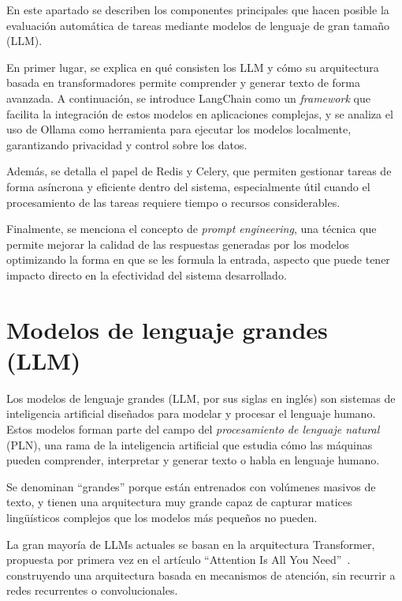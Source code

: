 
En este apartado se describen los componentes principales que hacen posible la evaluación 
automática de tareas mediante modelos de lenguaje de gran tamaño (LLM). 

En primer lugar, se explica en qué consisten los LLM y cómo su arquitectura basada en 
transformadores permite comprender y generar texto de forma avanzada. A continuación, 
se introduce LangChain como un \textit{framework} que facilita la integración de estos 
modelos en aplicaciones complejas, y se analiza el uso de Ollama como herramienta para 
ejecutar los modelos localmente, garantizando privacidad y control sobre los datos.

Además, se detalla el papel de Redis y Celery, que permiten gestionar tareas de forma 
asíncrona y eficiente dentro del sistema, especialmente útil cuando el procesamiento de 
las tareas requiere tiempo o recursos considerables.

Finalmente, se menciona el concepto de \textit{prompt engineering}, una técnica que permite 
mejorar la calidad de las respuestas generadas por los modelos optimizando la forma en que 
se les formula la entrada, aspecto que puede tener impacto directo en la efectividad del 
sistema desarrollado.

\section{Modelos de lenguaje grandes (LLM)}

Los modelos de lenguaje grandes (LLM, por sus siglas en inglés) son sistemas de 
inteligencia artificial diseñados para modelar y procesar el lenguaje humano. 
Estos modelos forman parte del campo del \textit{procesamiento de lenguaje natural} (PLN), 
una rama de la inteligencia artificial que estudia cómo las máquinas pueden comprender, 
interpretar y generar texto o habla en lenguaje humano.

Se denominan ``grandes'' porque están entrenados con volúmenes 
masivos de texto, y tienen una arquitectura muy grande capaz de capturar matices 
lingüísticos complejos que los modelos más pequeños no pueden.

La gran mayoría de LLMs actuales se basan en la arquitectura Transformer, propuesta por 
primera vez en el artículo ``Attention Is All You Need''~\cite{vaswani2017}. 
construyendo una arquitectura basada en mecanismos de atención, sin recurrir a 
redes recurrentes o convolucionales.

